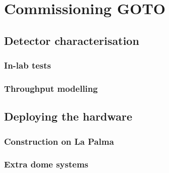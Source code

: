 \chapter{Commissioning GOTO}
\label{chap:commissioning}
\chaptoc{}

\newpage
\section{Detector characterisation}
\label{sec:detectors}

\lipsum{}

\subsection{In-lab tests}
\label{sec:detector_tests}

\lipsum{}

\subsection{Throughput modelling}
\label{sec:throughput}

\lipsum{}


\newpage
\section{Deploying the hardware}
\label{sec:hardware}

\lipsum{}

\subsection{Construction on La Palma}
\label{sec:construction}

\lipsum{}

\subsection{Extra dome systems}
\label{sec:arduino}

\lipsum{}
